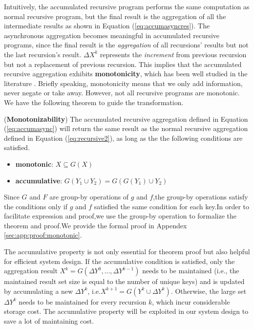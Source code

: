 Intuitively, the accumulated recursive program performs the same computation as normal recursive program, but the final result is the aggregation of all the intermediate results as shown in Equation (\ref{eq:accumasyncres}). The asynchronous aggregation becomes meaningful in accumulated recursive programs, since the final result is the \emph{aggregation} of all recursions' results but not the last recursion's result. $\Delta X^{k}$ represents the \emph{increment} from previous recursion but not a replacement of previous recursion. This implies that the accumulated recursive aggregation exhibits \textbf{monotonicity}, which has been well studied in the literature \cite{Hellerstein:2010:DIE:1860702.1860704,calm,Lam:2013:SDE:2510649.2511289,Wang:2015:AFR:2824032.2824052}. Briefly speaking, monotonicity means that we only add information, never negate or take away. However, not all recursive programs are monotonic. We have the following theorem to guide the transformation.
\begin{theorem}
	\label{th:monotone}
	(\textbf{Monotonizability}) The accumulated recursive aggregation defined in Equation (\ref{eq:accumasync}) will return the same result as the normal recursive aggregation defined in Equation (\ref{eq:recursive2}), as long as the the following conditions are satisfied.
	\begin{itemize}
		\item \textbf{monotonic}: $X\subseteq G(X)$
		\item \textbf{accumulative}: $G(Y_1\cup Y_2)=G(G(Y_1)\cup Y_2)$
	\end{itemize}
	
\end{theorem}
Since $G$ and $F$ are group-by operations of $g$ and $f$,the group-by operations satisfy the conditions only if $g$ and $f$ satisfied the same condition for each key.In order to facilitate expression and proof,we use the group-by operation to formalize the theorem and proof.We provide the formal proof in Appendex \ref{sec:app:proof:monotonic}.

The accumulative property is not only essential for theorem proof but also helpful for efficient system design. If the accumulative condition is satisfied, only the aggregation result $X^k=G(\Delta Y^{0},\ldots,\Delta Y^{k-1})$ needs to be maintained (i.e., the maintained result set size is equal to the number of unique keys) and is updated by accumulating a new $\Delta Y^{k}$, i.e.$X^{k+1}=G(Y^k \cup \Delta Y^k)$. Otherwise, the large set $\Delta Y^{k}$ needs to be maintained for every recursion $k$, which incur considerable storage cost. The accumulative property will be exploited in our system design to save a lot of maintaining cost.


